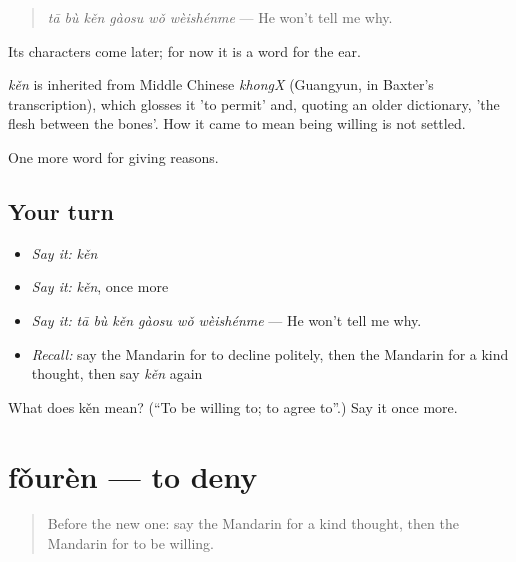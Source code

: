 \begin{quote}
\emph{tā bù kěn gàosu wǒ wèishénme} — He won't tell me why.
\end{quote}

Its characters come later; for now it is a word for the ear.

\begin{cousinweb}
\emph{kěn} is inherited from Middle Chinese \emph{khongX} (Guangyun, in Baxter's transcription), which glosses it 'to permit' and, quoting an older dictionary, 'the flesh between the bones'. How it came to mean being willing is not settled.
\end{cousinweb}

\begin{grammarlens}[title={What you've built}]
One more word for giving reasons.
\end{grammarlens}

\subsection*{Your turn}
\begin{itemize}
\raggedright
  \item \emph{Say it:} \emph{kěn}
  \item \emph{Say it:} \emph{kěn}, once more
  \item \emph{Say it:} \emph{tā bù kěn gàosu wǒ wèishénme} — He won't tell me why.
  \item \emph{Recall:} say the Mandarin for to decline politely, then the Mandarin for a kind thought, then say \emph{kěn} again
\end{itemize}

\begin{tcolorbox}[breakable,colback=teal!4,colframe=teal!35!black,title={Before you move on}]
What does kěn mean? (\textquotedblleft{}To be willing to; to agree to\textquotedblright{}.) Say it once more.
\end{tcolorbox}
\section[fǒurèn]{fǒurèn — to deny}

\label{lesson:ZH-C355-fouren}



\begin{quote}
Before the new one: say the Mandarin for a kind thought, then the Mandarin for to be willing.
\end{quote}

